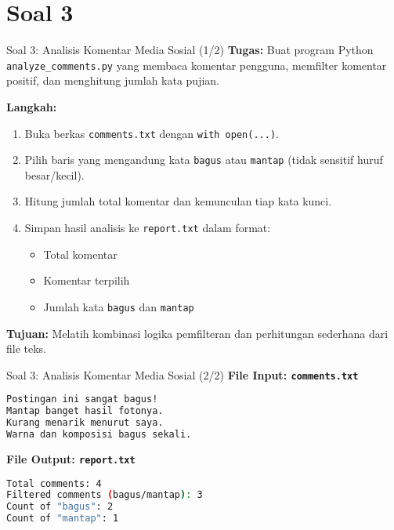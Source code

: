 \documentclass[aspectratio=169, table]{beamer}
\begin{document}
\section{Soal 3}
\begin{frame}[fragile]{Soal 3: Analisis Komentar Media Sosial (1/2)}
\vspace{15pt}
\textbf{Tugas:}  
Buat program Python \texttt{analyze\_comments.py} yang membaca komentar pengguna, memfilter komentar positif, dan menghitung jumlah kata pujian.

\textbf{Langkah:}
\begin{enumerate}
  \item Buka berkas \texttt{comments.txt} dengan \texttt{with open(...)}.
  \item Pilih baris yang mengandung kata \texttt{bagus} atau \texttt{mantap}  
        (tidak sensitif huruf besar/kecil).
  \item Hitung jumlah total komentar dan kemunculan tiap kata kunci.
  \item Simpan hasil analisis ke \texttt{report.txt} dalam format:
        \begin{itemize}
          \item Total komentar
          \item Komentar terpilih
          \item Jumlah kata \texttt{bagus} dan \texttt{mantap}
        \end{itemize}
\end{enumerate}
\textbf{Tujuan:}  
Melatih kombinasi logika pemfilteran dan perhitungan sederhana dari file teks.
\end{frame}

\begin{frame}[fragile]{Soal 3: Analisis Komentar Media Sosial (2/2)}
\vspace{15pt}
\textbf{File Input: \texttt{comments.txt}}
\begin{lstlisting}[language=bash,basicstyle=\ttfamily\small]
Postingan ini sangat bagus!
Mantap banget hasil fotonya.
Kurang menarik menurut saya.
Warna dan komposisi bagus sekali.
\end{lstlisting}

\textbf{File Output: \texttt{report.txt}}
\begin{lstlisting}[language=bash,basicstyle=\ttfamily\small]
Total comments: 4
Filtered comments (bagus/mantap): 3
Count of "bagus": 2
Count of "mantap": 1
\end{lstlisting}
\end{frame}
\end{document}
